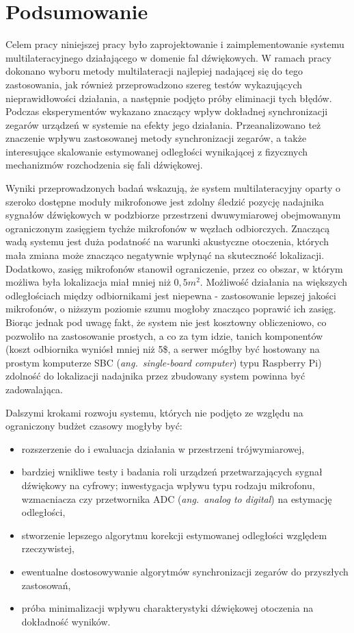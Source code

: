\chapter*{Podsumowanie}\label{chap:podsumowanie}

Celem pracy niniejszej pracy było zaprojektowanie i zaimplementowanie systemu multilateracyjnego działającego w domenie fal dźwiękowych. W ramach pracy dokonano wyboru metody multilateracji najlepiej nadającej się do tego zastosowania, jak również przeprowadzono szereg testów wykazujących nieprawidłowości działania, a następnie podjęto próby eliminacji tych błędów. Podczas eksperymentów wykazano znaczący wpływ dokładnej synchronizacji zegarów urządzeń w systemie na efekty jego działania. Przeanalizowano też znaczenie wpływu zastosowanej metody synchronizacji zegarów, a także interesujące skalowanie estymowanej odległości wynikającej z fizycznych mechanizmów rozchodzenia się fali dźwiękowej.

Wyniki przeprowadzonych badań wskazują, że system multilateracyjny oparty o szeroko dostępne moduły mikrofonowe jest zdolny śledzić pozycję nadajnika sygnałów dźwiękowych w podzbiorze przestrzeni dwuwymiarowej obejmowanym ograniczonym zasięgiem tychże mikrofonów w węzłach odbiorczych. Znaczącą wadą systemu jest duża podatność na warunki akustyczne otoczenia, których mała zmiana może znacząco negatywnie wpłynąć na skuteczność lokalizacji. Dodatkowo, zasięg mikrofonów stanowił ograniczenie, przez co obszar, w którym możliwa była lokalizacja miał mniej niż $0,5 m^2$. Możliwość działania na większych odległościach między odbiornikami jest niepewna {-} zastosowanie lepszej jakości mikrofonów, o niższym poziomie szumu mogłoby znacząco poprawić ich zasięg. Biorąc jednak pod uwagę fakt, że system nie jest kosztowny obliczeniowo, co pozwoliło na zastosowanie prostych, a co za tym idzie, tanich komponentów (koszt odbiornika wyniósł mniej niż 5\$, a serwer mógłby być hostowany na prostym komputerze SBC (\textit{ang.\ single-board computer}) typu Raspberry Pi) zdolność do lokalizacji nadajnika przez zbudowany system powinna być zadowalająca.

Dalszymi krokami rozwoju systemu, których nie podjęto ze względu na ograniczony budżet czasowy mogłyby być:

\begin{itemize}
    \item rozszerzenie do i ewaluacja działania w przestrzeni trójwymiarowej,
    \item bardziej wnikliwe testy i badania roli urządzeń przetwarzających sygnał dźwiękowy na cyfrowy; inwestygacja wpływu typu rodzaju mikrofonu, wzmacniacza czy przetwornika ADC (\textit{ang.\ analog to digital}) na estymację odległości,
    \item stworzenie lepszego algorytmu korekcji estymowanej odległości względem rzeczywistej,
    \item ewentualne dostosowywanie algorytmów synchronizacji zegarów do przyszłych zastosowań,
    \item próba minimalizacji wpływu charakterystyki dźwiękowej otoczenia na dokładność wyników.
\end{itemize}

